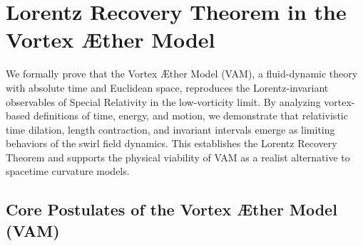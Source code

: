 
%
%
%
%
%
%
%
%
%
%
%
    \section{Lorentz Recovery Theorem in the Vortex Æther Model}
        We formally prove that the Vortex Æther Model (VAM), a fluid-dynamic theory with absolute time and Euclidean space, reproduces the Lorentz-invariant observables of Special Relativity in the low-vorticity limit. By analyzing vortex-based definitions of time, energy, and motion, we demonstrate that relativistic time dilation, length contraction, and invariant intervals emerge as limiting behaviors of the swirl field dynamics. This establishes the Lorentz Recovery Theorem and supports the physical viability of VAM as a realist alternative to spacetime curvature models.
    \subsection{Core Postulates of the Vortex Æther Model (VAM)}


